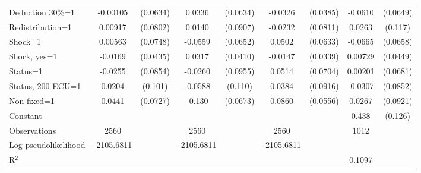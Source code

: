 \begin{tabular}{l|cccccc|cc}
Deduction 30\%=1& -0.00105         & (0.0634)&   0.0336         & (0.0634)&  -0.0326         & (0.0385)&  -0.0610         & (0.0649)\\
Redistribution=1&  0.00917         & (0.0802)&   0.0140         & (0.0907)&  -0.0232         & (0.0811)&   0.0263         &  (0.117)\\
Shock=1         &  0.00563         & (0.0748)&  -0.0559         & (0.0652)&   0.0502         & (0.0633)&  -0.0665         & (0.0658)\\
Shock, yes=1    &  -0.0169         & (0.0435)&   0.0317         & (0.0410)&  -0.0147         & (0.0339)&  0.00729         & (0.0449)\\
Status=1        &  -0.0255         & (0.0854)&  -0.0260         & (0.0955)&   0.0514         & (0.0704)&  0.00201         & (0.0681)\\
Status, 200 ECU=1&   0.0204         &  (0.101)&  -0.0588         &  (0.110)&   0.0384         & (0.0916)&  -0.0307         & (0.0852)\\
Non-fixed=1     &   0.0441         & (0.0727)&   -0.130\sym{*}  & (0.0673)&   0.0860         & (0.0556)&   0.0267         & (0.0921)\\
Constant        &                  &         &                  &         &                  &         &    0.438\sym{***}&  (0.126)\\
\hline
Observations    &     2560         &         &     2560         &         &     2560         &         &     1012         &         \\
Log pseudolikelihood  & -2105.6811   &         &     -2105.6811             &         &     -2105.6811             &         &           &   \\ 
R$^2$      &                  &         &                  &         &                  &         &      0.1097     &   \\ 


\end{tabular}

